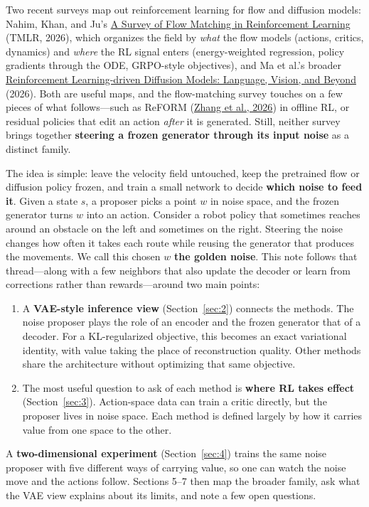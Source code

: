 Two recent surveys map out reinforcement learning for flow and diffusion models: Nahim, Khan, and Ju's \hyperlink{ref:14}{A Survey of Flow Matching in Reinforcement Learning} (TMLR, 2026), which organizes the field by \emph{what} the flow models (actions, critics, dynamics) and \emph{where} the RL signal enters (energy-weighted regression, policy gradients through the ODE, GRPO-style objectives), and Ma et al.'s broader \hyperlink{ref:10}{Reinforcement Learning-driven Diffusion Models: Language, Vision, and Beyond} (2026). Both are useful maps, and the flow-matching survey touches on a few pieces of what follows---such as ReFORM (\hyperlink{ref:23}{Zhang et al., 2026}) in offline RL, or residual policies that edit an action \emph{after} it is generated. Still, neither survey brings together \textbf{steering a frozen generator through its input noise} as a distinct family.

The idea is simple: leave the velocity field untouched, keep the pretrained flow or diffusion policy frozen, and train a small network to decide \textbf{which noise to feed it}. Given a state $s$, a proposer picks a point $w$ in noise space, and the frozen generator turns $w$ into an action. Consider a robot policy that sometimes reaches around an obstacle on the left and sometimes on the right. Steering the noise changes how often it takes each route while reusing the generator that produces the movements. We call this chosen $w$ \textbf{the golden noise}. This note follows that thread---along with a few neighbors that also update the decoder or learn from corrections rather than rewards---around two main points:

\begin{enumerate}
\item A \textbf{VAE-style inference view} (Section~\ref{sec:2}) connects the methods. The noise proposer plays the role of an encoder and the frozen generator that of a decoder. For a KL-regularized objective, this becomes an exact variational identity, with value taking the place of reconstruction quality. Other methods share the architecture without optimizing that same objective.
\item The most useful question to ask of each method is \textbf{where RL takes effect} (Section~\ref{sec:3}). Action-space data can train a critic directly, but the proposer lives in noise space. Each method is defined largely by how it carries value from one space to the other.
\end{enumerate}

A \textbf{two-dimensional experiment} (Section~\ref{sec:4}) trains the same noise proposer with five different ways of carrying value, so one can watch the noise move and the actions follow. Sections 5--7 then map the broader family, ask what the VAE view explains about its limits, and note a few open questions.

